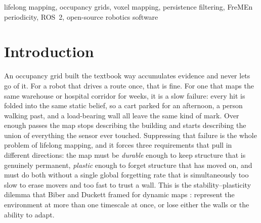 \documentclass[conference]{IEEEtran}
\begin{document}
\begin{abstract}
as synthetic hit points to the two ray-casting backends; no real or simulated
LiDAR scans are processed, and no external baseline, FreMEn included, is run),
reports that both backends graduate a static wall by the third window and hold recall 1.0
thereafter (their only map-quality divergence, a clutter-induced
static-precision gap of 0.9253 vs.\ 0.9758 under 100 movers per window, arises
in the geometry backends' native sampling, not in the shared classifier);
that 50\%-duty periodic doors are detected at true-positive rate 2/3 and
false-positive rate 1/5; that removing hysteresis inflates flicker from 54 to
574 toggles on identical replayed noise (at fixed decay $\lambda=0.90$); and that, with periodicity off, the
estimated memory is a flat $\sim$56~B per live cell (evidence record and hash
node only) with no per-dimension penalty. Evaluation is synthetic and
the tool performs no SLAM; STRATA is the persistence core meant to sit beneath
an external localizer, released open-source as a ROS~2 package.
\end{abstract}

\begin{IEEEkeywords}
lifelong mapping, occupancy grids, voxel mapping, persistence filtering, FreMEn periodicity, ROS~2, open-source robotics software
\end{IEEEkeywords}

\section{Introduction}

An occupancy grid built the textbook way accumulates evidence and never lets go
of it. For a robot that drives a route once, that is fine. For one that maps the
same warehouse or hospital corridor for weeks, it is a slow failure: every hit
is folded into the same static belief, so a cart parked for an afternoon, a
person walking past, and a load-bearing wall all leave the same kind of mark.
Over enough passes the map stops describing the building and starts describing
the union of everything the sensor ever touched. Suppressing that failure is the
whole problem of lifelong mapping, and it forces three requirements that pull in
different directions: the map must be \emph{durable} enough to keep structure that is
genuinely permanent, \emph{plastic} enough to forget structure that has moved on, and
must do both without a single global forgetting rate that is simultaneously too
slow to erase movers and too fast to trust a wall. This is the
stability--plasticity dilemma that Biber and Duckett framed for dynamic maps
\cite{biber2005dynamicmaps}: represent the environment at more than one timescale at
once, or lose either the walls or the ability to adapt.
\end{document}
